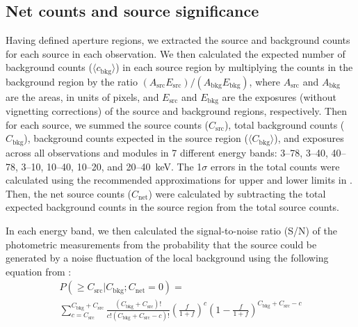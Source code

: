 \documentclass[iop,revtex4]{emulateapj}
\begin{document}
\subsection{Net counts and source significance} 
\label{sec:counts}
Having defined aperture regions, we extracted the source and background counts for each source in each observation.  We then calculated the expected number of background counts ($\langle c_{\mathrm{bkg}} \rangle$) in each source region by multiplying the counts in the background region by the ratio $(A_{\mathrm{src}} E_{\mathrm{src}})/(A_{\mathrm{bkg}} E_{\mathrm{bkg}})$, where $A_{\mathrm{src}}$ and $A_{\mathrm{bkg}}$ are the areas, in units of pixels, and $E_{\mathrm{src}}$ and $E_{\mathrm{bkg}}$ are the exposures (without vignetting corrections) of the source and background regions, respectively.  Then for each source, we summed the source counts ($C_{\mathrm{src}}$), total background counts ($C_{\mathrm{bkg}}$), background counts expected in the source region ($\langle C_{\mathrm{bkg}} \rangle$), and exposures across all observations and modules in 7 different energy bands: 3--78, 3--40, 40--78, 3--10, 10--40, 10--20, and 20--40~keV.   The 1$\sigma$ errors in the total counts were calculated using the recommended approximations for upper and lower limits in \citet{gehr}.  Then, the net source counts ($C_{\mathrm{net}}$) were calculated by subtracting the total expected background counts in the source region from the total source counts.  \par
In each energy band, we then calculated the signal-to-noise ratio (S/N) of the photometric measurements from the probability that the source could be generated by a noise fluctuation of the local background using the following equation from \citet{weiss07}:
\begin{multline}
P(\geq C_{\mathrm{src}}|C_{\mathrm{bkg}};C_{\mathrm{net}}=0) = \\ \sum_{c = C_{\mathrm{src}}}^{C_{\mathrm{bkg}}+C_{\mathrm{src}}}\frac{(C_{\mathrm{bkg}}+C_{\mathrm{src}})!}{c!(C_{\mathrm{bkg}}+C_{\mathrm{src}}-c)!}\left(\frac{f}{1+f}\right)^c\left( 1-\frac{f}{1+f}\right)^{C_{\mathrm{bkg}}+C_{\mathrm{src}}-c} 
\label{eq:probnoise}
\end{multline}
\end{document}
